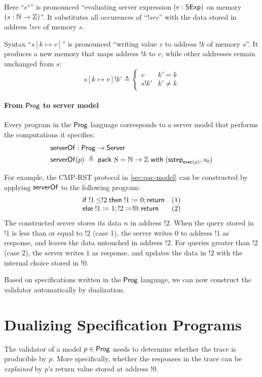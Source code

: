 Here ``$e^s$'' is pronounced ``evaluating server expression $(e:\mathsf{SExp})$ on
memory $(s:\mathbb N\to\mathbb Z)$''.  It substitutes all occurences of ``$!src$'' with
the data stored in address $!src$ of memory $s$.

Syntax ``$s[k\mapsto v]$'' is pronounced ``writing value $v$ to address $!k$ of
memory $s$''.  It produces a new memory that maps address $!k$ to $v$, while
other addresses remain unchanged from $s$:
\[s[k\mapsto v]!k'\triangleq\begin{cases}v&k'=k\\
s!k'&k'\neq k\end{cases}\]

\paragraph{From $\mathsf{Prog}$ to server model}
Every program in the $\mathsf{Prog}$ language corresponds to a server model that
performs the computations it specifies:
\begin{align*}
  &\mathsf{serverOf}:\mathsf{Prog}\to\mathsf{Server}\\
  &\mathsf{serverOf}(p)\;\triangleq\;\mathsf{pack}\;S=\mathbb N\to\mathbb Z\;\mathsf{with}\;(\mathsf{sstep}_{\mathsf{exec}(p)},s_0)
\end{align*}

For example, the CMP-RST protocol in \autoref{sec:qac-model} can be constructed
by applying $\mathsf{serverOf}$ to the following program:
\[\begin{array}{ll}
\mathsf{if}\; !1\le!2\;\mathsf{then}\; !1\coloneqq0;\mathsf{return}&(1)\\
\mathsf{else}\;!1\coloneqq1;!2\coloneqq!0;\mathsf{return}&(2)
\end{array}\]
The constructed server stores its data $n$ in address $!2$.  When the query
stored in $!1$ is less than or equal to $!2$ (case 1), the server writes $0$ to
address $!1$ as response, and leaves the data untouched in address $!2$.  For
queries greater than $!2$ (case 2), the server writes $1$ as response, and
updates the data in $!2$ with the internal choice stored in $!0$.

Based on specifications written in the $\mathsf{Prog}$ language, we can now construct
the validator automatically by dualization.

\section{Dualizing Specification Programs}
\label{sec:dualize-prog}
The validator of a model $p\in\mathsf{Prog}$ needs to determine whether the trace is
producible by $p$.  More specifically, whether the responses in the trace can be
{\em explained} by $p$'s return value stored at address $!0$.

